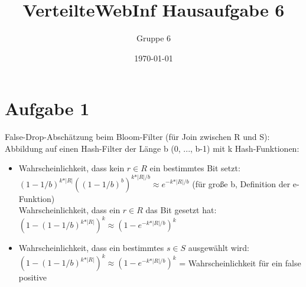\documentclass[a4paper]{article}
\author{Gruppe 6}
\title{\textbf{VerteilteWebInf Hausaufgabe 6}}
\date{\today}
\begin{document}
\maketitle


\section*{Aufgabe 1}
False-Drop-Abschätzung beim Bloom-Filter (für Join zwischen R und S): \\
Abbildung auf einen Hash-Filter der Länge b (0, ..., b-1) mit k Hash-Funktionen:
\begin{itemize}
\item Wahrscheinlichkeit, dass kein $ r \in R $ ein bestimmtes Bit setzt: $ (1-1/b)^{k* \vert R \vert} ((1-1/b)^b)^{k*\vert R \vert / b} \approx e^{-k*\vert R \vert / b} $ (für große b, Definition der e-Funktion)\\
Wahrscheinlichkeit, dass ein $ r \in R $ das Bit gesetzt hat: $ (1- (1-1/b)^{k*\vert R \vert})^k \approx (1-e^{-k*\vert R \vert / b})^k $
\item Wahrscheinlichkeit, dass ein bestimmtes $ s \in S $ ausgewählt wird: $ (1- (1-1/b)^{k*\vert R \vert})^k \approx (1-e^{-k*\vert R \vert / b})^k $ = Wahrscheinlichkeit für ein false positive
\end{itemize}
\end{document}
